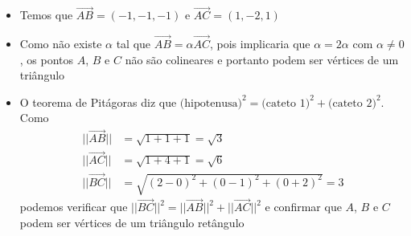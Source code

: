 \documentclass[brazilian, fleqn]{article}
\renewcommand{\vec}[1]{\overrightarrow{#1}}
\begin{document}
\begin{enumerate}
        \begin{tcolorbox}
            \begin{itemize}
                \item Temos que \(\vec{AB}=(-1,-1,-1)\) e \(\vec{AC}=(1,-2,1)\)
                \item Como não existe \(\alpha\) tal que \(\vec{AB} = \alpha \vec{AC}\),
                    pois implicaria que \(\alpha = 2\alpha\) com \(\alpha \neq 0\), os
                    pontos \(A\), \(B\) e \(C\) não são colineares e portanto podem ser
                    vértices de um triângulo
                \item O teorema de Pitágoras diz que \(\text{(hipotenusa)}^2=\text{(cateto 1)}^2+\text{(cateto 2)}^2\). Como
                    \begin{align*}
                        ||\vec{AB}|| &=\sqrt{1+1+1}=\sqrt{3} \\
                        ||\vec{AC}|| &=\sqrt{1+4+1}=\sqrt{6} \\
                        ||\vec{BC}|| &=\sqrt{(2-0)^2+(0-1)^2+(0+2)^2}=3
                    \end{align*}
                    podemos verificar que \(||\vec{BC}||^2=||\vec{AB}||^2+||\vec{AC}||^2\) e confirmar que \(A\), \(B\) e
                    \(C\) podem ser vértices de um triângulo retângulo
            \end{itemize}
        \end{tcolorbox}
\end{enumerate}
\end{document}
